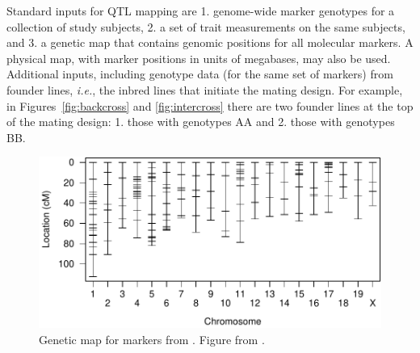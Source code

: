 \documentclass[oneside]{book}\usepackage[]{graphicx}\usepackage[]{color}
\newenvironment{knitrout}{}{} %
\begin{document}
Standard inputs for QTL mapping are 1. genome-wide marker genotypes
for a collection of study subjects, 2. a set of trait measurements on the
same subjects, and 3. a genetic map that contains genomic positions for
all molecular markers. A physical map, with marker positions in 
units of megabases, may also be used. 
Additional inputs, including genotype data (for the same
set of markers) from founder lines, \emph{i.e.}, the inbred lines that initiate
the mating design. For example, in Figures~\ref{fig:backcross} and \ref{fig:intercross}
there are two founder lines at the top of the mating design: 1. those with genotypes AA and 2. those with genotypes BB. 

\begin{knitrout}
\color{fgcolor}\begin{figure}
\includegraphics[width=6in]{figure/map-1} \caption{Genetic map for markers from \citet{sugiyama2001concordance}. Figure from \citet{broman2009guide}.}\label{fig:map}
\end{figure}


\end{knitrout}
\end{document}

